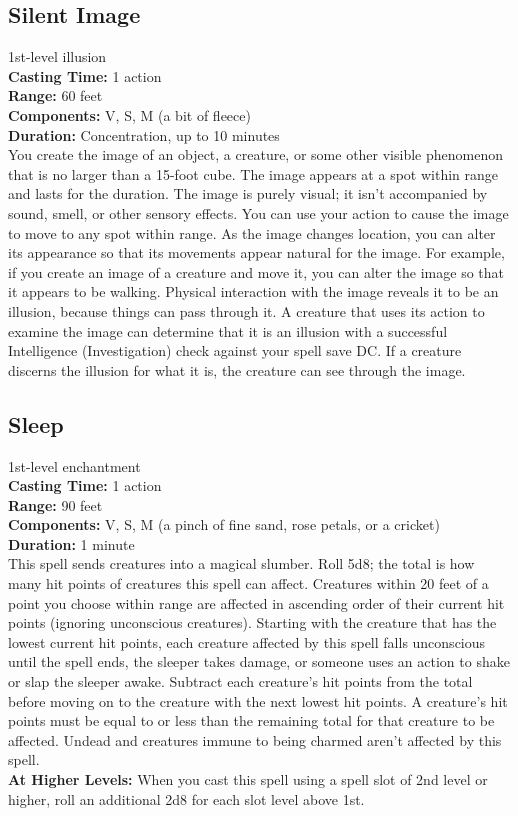 \documentclass[11pt, A4paper, english]{article}
\begin{document}
		\subsection{Silent Image}
1st-level illusion \\
\textbf{Casting Time:} 1 action \\
\textbf{Range:} 60 feet \\
\textbf{Components:} V, S, M (a bit of fleece) \\
\textbf{Duration:} Concentration, up to  10 minutes \\
You create the image of an object, a creature, or some other visible phenomenon that is no larger than a 15-foot cube. The image appears at a spot within range and lasts for the duration. The image is purely visual; it isn't accompanied by sound, smell, or other sensory effects. You can use your action to cause the image to move to any spot within range. As the image changes location, you can alter its appearance so that its movements appear natural for the image. For example, if you create an image of a creature and move it, you can alter the image so that it appears to be walking. Physical interaction with the image reveals it to be an illusion, because things can pass through it. A creature that uses its action to examine the image can determine that it is an illusion with a successful Intelligence (Investigation) check against your spell save DC. If a creature discerns the illusion for what it is, the creature can see through the image.

		\subsection{Sleep}
1st-level enchantment \\
\textbf{Casting Time:} 1 action \\
\textbf{Range:} 90 feet \\
\textbf{Components:} V, S, M (a pinch of fine sand, rose petals, or a cricket) \\
\textbf{Duration:} 1 minute \\
This spell sends creatures into a magical slumber. Roll 5d8; the total is how many hit points of creatures this spell can affect. Creatures within 20 feet of a point you choose within range are affected in ascending order of their current hit points (ignoring unconscious creatures). Starting with the creature that has the lowest current hit points, each creature affected by this spell falls unconscious until the spell ends, the sleeper takes damage, or someone uses an action to shake or slap the sleeper awake. Subtract each creature's hit points from the total before moving on to the creature with the next lowest hit points. A creature’s hit points must be equal to or less than the remaining total for that creature to be affected. Undead and creatures immune to being charmed aren't affected by this spell. \\
\textbf{At Higher Levels:} When you cast this spell using a spell slot of 2nd level or higher, roll an additional 2d8 for each slot level above 1st.
\end{document}
